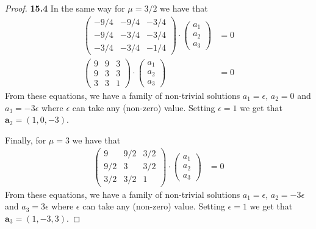 \documentclass[11pt]{article}
\theoremstyle{definition}
\begin{document}
\begin{proof}{\textbf{15.4}}
    In the same way for $\mu = 3/2$ we have that
    \begin{align*}
        \begin{pmatrix}
            -9/4 & -9/4 & -3/4\\
            -9/4 & -3/4 & -3/4\\
            -3/4 & -3/4 & -1/4
        \end{pmatrix}\cdot
        \begin{pmatrix}
            a_1\\ a_2\\ a_3
        \end{pmatrix}
        &= 0\\
        \begin{pmatrix}
            9 & 9 & 3\\
            9 & 3 & 3\\
            3 & 3 & 1
        \end{pmatrix}\cdot
        \begin{pmatrix}
            a_1\\ a_2\\ a_3
        \end{pmatrix}
        &= 0
    \end{align*}
    From these equations, we have a family of non-trivial solutions
    $a_1 = \epsilon$, $a_2 = 0$ and $a_3 = -3\epsilon$
    where $\epsilon$ can take any (non-zero) value. Setting $\epsilon = 1$
    we get that $\bm{a}_2 = (1, 0, -3)$.

    Finally, for $\mu = 3$ we have that
    \begin{align*}
        \begin{pmatrix}
            9 & 9/2 & 3/2\\
            9/2 & 3 & 3/2\\
            3/2 & 3/2 & 1
        \end{pmatrix}\cdot
        \begin{pmatrix}
            a_1\\ a_2\\ a_3
        \end{pmatrix}
        &= 0
    \end{align*}
    From these equations, we have a family of non-trivial solutions
    $a_1 = \epsilon$, $a_2 = -3\epsilon$ and $a_3 = 3\epsilon$
    where $\epsilon$ can take any (non-zero) value. Setting $\epsilon = 1$
    we get that $\bm{a}_3 = (1, -3, 3)$.


\end{proof}
\end{document}
